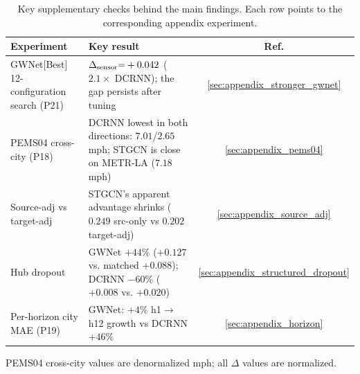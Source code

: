 \begin{table}[h]
\centering
\caption{Key supplementary checks behind the main findings.
Each row points to the corresponding appendix experiment.}
\label{tab:consolidated}
\small
\begin{tabular}{p{2.8cm}p{5.5cm}c}
\toprule
\textbf{Experiment} & \textbf{Key result} & \textbf{Ref.} \\
\midrule
GWNet[Best] 12-configuration search (P21)
  & $\Delta_{\text{sensor}}{=}+0.042$ ($2.1{\times}$ DCRNN); the gap persists after tuning
  & \ref{sec:appendix_stronger_gwnet} \\
PEMS04 cross-city (P18)
  & DCRNN lowest in both directions: $7.01$/$2.65$ mph; STGCN is close on METR-LA ($7.18$ mph)
  & \ref{sec:appendix_pems04} \\
Source-adj vs target-adj
  & STGCN's apparent advantage shrinks ($0.249$ src-only vs $0.202$ target-adj)
  & \ref{sec:appendix_source_adj} \\
Hub dropout
  & GWNet $+44\%$ ($+0.127$ vs. matched $+0.088$); DCRNN $-60\%$ ($+0.008$ vs. $+0.020$)
  & \ref{sec:appendix_structured_dropout} \\
Per-horizon city MAE (P19)
  & GWNet: $+4\%$ h1$\to$h12 growth vs DCRNN $+46\%$
  & \ref{sec:appendix_horizon} \\
\bottomrule
\end{tabular}
\vskip 0.03in
{\footnotesize PEMS04 cross-city values are denormalized mph; all $\Delta$ values are normalized.}
\end{table}
